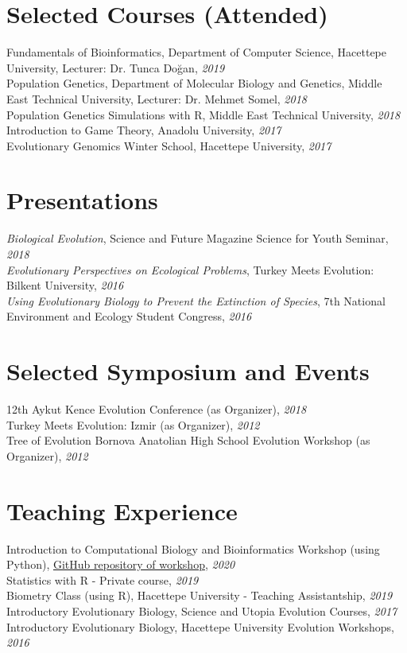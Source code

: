 \documentclass[letterpaper,11pt]{article}
\begin{document}
\section{Selected Courses (Attended)}
Fundamentals of Bioinformatics, Department of Computer Science, Hacettepe University, Lecturer: Dr. Tunca Do\u{g}an,  \textit{2019} \\
Population Genetics, Department of Molecular Biology and Genetics, Middle East Technical University, Lecturer: Dr. Mehmet Somel, \textit{2018} \\
Population Genetics Simulations with R, Middle East Technical University, \textit{2018} \\
Introduction to Game Theory, Anadolu University, \textit{2017} \\
Evolutionary Genomics Winter School, Hacettepe University, \textit{2017} 

\section{Presentations}
{\textit{Biological Evolution}}, Science and Future Magazine Science for Youth Seminar,  \textit{2018} \\
{\textit{Evolutionary Perspectives on Ecological Problems}}, Turkey Meets Evolution: Bilkent University,  \textit{2016} \\
{\textit{Using Evolutionary Biology to Prevent the Extinction of
Species}}, 7th National Environment and Ecology Student Congress,  \textit{2016}

\section{Selected Symposium and Events}
12th Aykut Kence Evolution Conference (as Organizer), \textit{2018} \\
Turkey Meets Evolution: Izmir (as Organizer), \textit{2012} \\
Tree of Evolution Bornova Anatolian High School Evolution Workshop (as Organizer), \textit{2012} \\

\section{Teaching Experience}
Introduction to Computational Biology and Bioinformatics Workshop (using Python), \href{https://github.com/isinaltinkaya/Hesaplamali_Biyoloji_ve_Biyoinformatige_Giris_2020}{GitHub repository of workshop}, \textit{2020}\\
Statistics with R - Private course, \textit{2019} \\
Biometry Class (using R), Hacettepe University - Teaching Assistantship, \textit{2019} \\
Introductory Evolutionary Biology, Science and Utopia Evolution Courses, \textit{2017} \\
Introductory Evolutionary Biology, Hacettepe University Evolution Workshops, \textit{2016} \\
\end{document}
